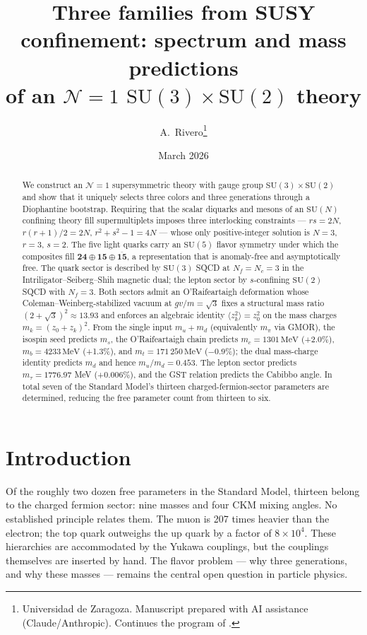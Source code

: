 \documentclass[12pt,a4paper]{article}
\title{Three families from SUSY confinement: spectrum and mass predictions\\
of an $\mathcal{N}=1$ $\mathrm{SU}(3)\times\mathrm{SU}(2)$ theory}
\author{A.~Rivero\thanks{Universidad de Zaragoza.
Manuscript prepared with AI assistance (Claude/Anthropic).
Continues the program of \cite{Rivero2005}.}}
\date{March 2026}
\newcommand{\MeV}{\,\text{MeV}}
\begin{document}
\maketitle

\begin{abstract}
We construct an $\mathcal{N}=1$ supersymmetric theory with gauge group
$\mathrm{SU}(3) \times \mathrm{SU}(2)$ and show that it uniquely selects
three colors and three generations through a Diophantine bootstrap.
Requiring that the scalar diquarks and mesons of an $\mathrm{SU}(N)$
confining theory fill supermultiplets imposes three interlocking
constraints --- $rs = 2N$, $r(r+1)/2 = 2N$, $r^2 + s^2 - 1 = 4N$ ---
whose only positive-integer solution is $N=3$, $r=3$, $s=2$. The five
light quarks carry an $\mathrm{SU}(5)$ flavor symmetry under which the
composites fill $\mathbf{24}\oplus\mathbf{15}\oplus\overline{\mathbf{15}}$,
a representation that is anomaly-free and asymptotically free.
The quark sector is described by $\mathrm{SU}(3)$ SQCD at
$N_f = N_c = 3$ in the Intriligator--Seiberg--Shih magnetic dual; the
lepton sector by $s$-confining $\mathrm{SU}(2)$ SQCD with $N_f = 3$.
Both sectors admit an O'Raifeartaigh deformation whose
Coleman--Weinberg-stabilized vacuum at $gv/m = \sqrt{3}$ fixes a
structural mass ratio $(2+\sqrt{3})^2 \approx 13.93$ and enforces an
algebraic identity $\langle z_k^2 \rangle = z_0^2$ on the
mass charges $m_k = (z_0 + z_k)^2$. From the single input $m_u + m_d$
(equivalently $m_\pi$ via GMOR), the isospin seed predicts $m_s$,
the O'Raifeartaigh chain predicts $m_c = 1301\MeV$ (+2.0\%),
$m_b = 4233\MeV$ (+1.3\%), and $m_t = 171\,250\MeV$ ($-$0.9\%);
the dual mass-charge identity predicts $m_d$ and hence $m_u/m_d = 0.453$.
The lepton sector predicts
$m_\tau = 1776.97$ MeV (+0.006\%), and the GST relation predicts
the Cabibbo angle.
In total seven of the Standard Model's
thirteen charged-fermion-sector parameters are determined, reducing the
free parameter count from thirteen to six.
\end{abstract}

\section{Introduction}

Of the roughly two dozen free parameters in the Standard Model, thirteen
belong to the charged fermion sector: nine masses and four CKM mixing
angles. No established principle relates them. The muon is 207 times
heavier than the electron; the top quark outweighs the up quark by a
factor of $8 \times 10^4$. These hierarchies are accommodated by the
Yukawa couplings, but the couplings themselves are inserted by hand. The
flavor problem --- why three generations, and why these masses --- remains
the central open question in particle physics.
\end{document}
